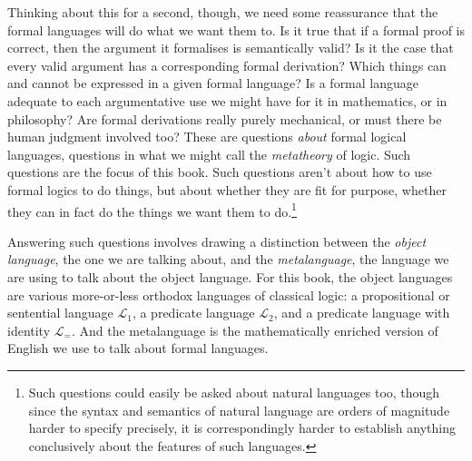 \documentclass[openany,leqno,11pt]{book}
\theoremstyle{break}
\theoremstyle{definition}
\theoremstyle{remark}
\newcommand{\lone}{\ensuremath{\mathcal{L}_{1}}}
\newcommand{\ltwo}{\ensuremath{\mathcal{L}_{2}}}
\newcommand{\lequ}{\ensuremath{\mathcal{L}_{=}}}
\begin{document}
Thinking about this for a second, though, we need some reassurance that the formal languages will do what we want them to. Is it true that if a formal proof is correct, then the argument it formalises is semantically valid? Is it the case that every valid argument has a corresponding formal derivation? Which things can and cannot be expressed in a given formal language? Is a formal language adequate to each argumentative use we might have for it in mathematics, or in philosophy? Are formal derivations really purely mechanical, or must there be human judgment involved too? These are questions \emph{about} formal logical languages, questions in what we might call the \emph{metatheory} of logic. Such questions are the focus of this book. Such questions aren't about how to use formal logics to do things, but about whether they are fit for purpose, whether they can in fact do the things we want them to do.\footnote{Such questions could easily be asked about natural languages too, though since the syntax and semantics of natural language are orders of magnitude harder to specify precisely, it is correspondingly harder to establish anything conclusively about the features of such languages.}

Answering such questions involves drawing a distinction between the \emph{object language}, the one we are talking about, and the \emph{metalanguage}, the language we are using to talk about the object language. For this book, the object languages are various more-or-less orthodox languages of classical logic: a propositional or sentential language \lone, a predicate language \ltwo, and a predicate language with identity \lequ. And the metalanguage is the mathematically enriched version of English we use to talk about formal languages. 
\end{document}
